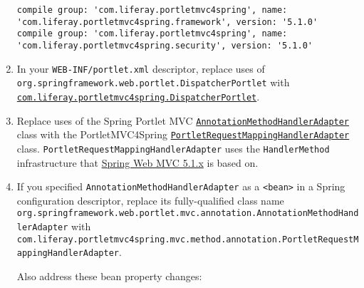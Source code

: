 \begin{enumerate}
\begin{verbatim}
compile group: 'com.liferay.portletmvc4spring', name: 'com.liferay.portletmvc4spring.framework', version: '5.1.0'
compile group: 'com.liferay.portletmvc4spring', name: 'com.liferay.portletmvc4spring.security', version: '5.1.0'
\end{verbatim}
\item
  In your \texttt{WEB-INF/portlet.xml} descriptor, replace uses of
  \texttt{org.springframework.web.portlet.DispatcherPortlet} with
  \href{https://liferay.github.io/portletmvc4spring/apidocs/com/liferay/portletmvc4spring/DispatcherPortlet.html}{\texttt{com.liferay.portletmvc4spring.DispatcherPortlet}}.
\item
  Replace uses of the Spring Portlet MVC
  \href{https://docs.spring.io/spring-framework/docs/4.3.4.RELEASE/javadoc-api/org/springframework/web/portlet/mvc/annotation/AnnotationMethodHandlerAdapter.html}{\texttt{AnnotationMethodHandlerAdapter}}
  class with the PortletMVC4Spring
  \href{https://liferay.github.io/portletmvc4spring/apidocs/com/liferay/portletmvc4spring/mvc/method/annotation/PortletRequestMappingHandlerAdapter.html}{\texttt{PortletRequestMappingHandlerAdapter}}
  class. \texttt{PortletRequestMappingHandlerAdapter} uses the
  \texttt{HandlerMethod} infrastructure that
  \href{https://docs.spring.io/spring/docs/5.1.x/spring-framework-reference/web.html\#spring-web}{Spring
  Web MVC 5.1.x} is based on.
\item
  If you specified \texttt{AnnotationMethodHandlerAdapter} as a
  \texttt{\textless{}bean\textgreater{}} in a Spring configuration
  descriptor, replace its fully-qualified class name
  \texttt{org.springframework.web.portlet.mvc.annotation.AnnotationMethodHandlerAdapter}
  with
  \texttt{com.liferay.portletmvc4spring.mvc.method.annotation.PortletRequestMappingHandlerAdapter}.

  Also address these bean property changes:


\end{enumerate}
